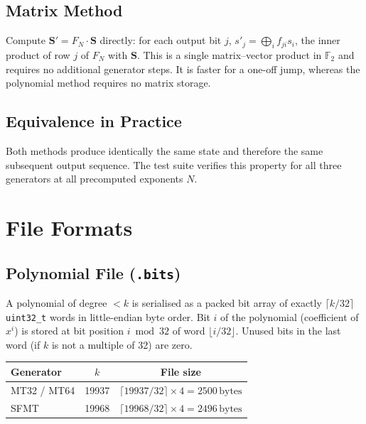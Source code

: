 \documentclass{article}
\begin{document}
\subsection{Matrix Method}

Compute $\mathbf{S}' = F_N \cdot \mathbf{S}$ directly: for each output bit $j$,
$s'_j = \bigoplus_{i} f_{ji} s_i$, the inner product of row $j$ of $F_N$ with $\mathbf{S}$.
This is a single matrix--vector product in $\mathbb{F}_2$ and requires no additional
generator steps.  It is faster for a one-off jump, whereas the polynomial method requires
no matrix storage.

\subsection{Equivalence in Practice}

Both methods produce identically the same state and therefore the same subsequent output
sequence.  The test suite verifies this property for all three generators at all precomputed
exponents $N$.

\section{File Formats}
\label{sec:fileformats}

\subsection{Polynomial File (\texttt{.bits})}

A polynomial of degree $< k$ is serialised as a packed bit array of exactly
$\lceil k/32 \rceil$ \texttt{uint32\_t} words in little-endian byte order.  Bit $i$ of
the polynomial (coefficient of $x^i$) is stored at bit position $i \bmod 32$ of word
$\lfloor i/32 \rfloor$.  Unused bits in the last word (if $k$ is not a multiple of 32)
are zero.

\begin{center}
\begin{tabular}{lcc}
\toprule
Generator & $k$ & File size \\
\midrule
MT32 / MT64 & 19937 & $\lceil 19937/32 \rceil \times 4 = 2500\,\text{bytes}$ \\
SFMT        & 19968 & $\lceil 19968/32 \rceil \times 4 = 2496\,\text{bytes}$ \\
\bottomrule
\end{tabular}
\end{center}
\end{document}
